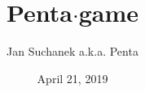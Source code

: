 \documentclass[DIV=19,b5paper,12pt,spanish,russian,french,ngerman,latin,bahasai,english]{scrartcl}
\title{Penta$\cdot$game}
\author{Jan Suchanek a.k.a. Penta}
\date{April 21, 2019}
\newcommand{\layout}{}
\begin{document}
\maketitle

\tableofcontents

\newpage



\layout
\pagebreak


\layout
\pagebreak


\layout
\pagebreak



\layout
\pagebreak


\layout
\pagebreak


\layout
\pagebreak


\layout
\pagebreak


\layout
\pagebreak

\begin{CJK*}{UTF8}{bkai}

\layout
\end{CJK*}
\pagebreak

\begin{CJK*}{UTF8}{gbsn}

\layout
\end{CJK*}

\end{document}
